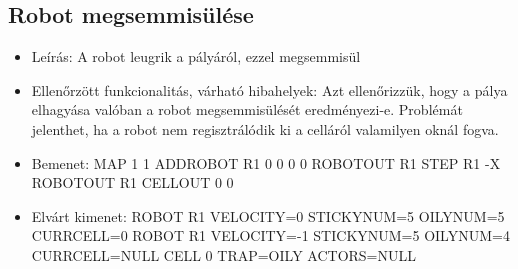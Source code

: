 \subsection{Robot megsemmisülése}
\begin{itemize}
	\item Leírás: \newline
A robot leugrik a pályáról, ezzel megsemmisül
	\item Ellenőrzött funkcionalitás, várható hibahelyek: \newline
Azt ellenőrizzük, hogy a pálya elhagyása valóban a robot megsemmisülését eredményezi-e. Problémát jelenthet, ha a robot nem regisztrálódik ki a celláról valamilyen oknál fogva.

	\item Bemenet: \newline
MAP 1 1 \newline
ADDROBOT R1 0 0 0 0 \newline
ROBOTOUT R1 \newline
STEP R1 -X \newline
ROBOTOUT R1 \newline
CELLOUT 0 0

	\item Elvárt kimenet: \newline
ROBOT R1 VELOCITY=0 STICKYNUM=5 OILYNUM=5 CURRCELL=0 \newline
ROBOT R1 VELOCITY=-1 STICKYNUM=5 OILYNUM=4 CURRCELL=NULL \newline
CELL 0 TRAP=OILY ACTORS=NULL \newline

\end{itemize}

